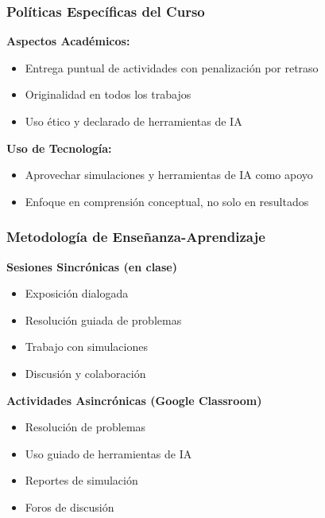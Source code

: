 \documentclass{beamer}
\begin{document}
\begin{frame}
	\frametitle{Políticas Específicas del Curso}
	
	\textbf{Aspectos Académicos:}
	
	\begin{itemize}
		\item Entrega puntual de actividades con penalización por retraso
		\item Originalidad en todos los trabajos
		\item Uso ético y declarado de herramientas de IA
	\end{itemize}

	\textbf{Uso de Tecnología:}
	
	\begin{itemize}
		\item Aprovechar simulaciones y herramientas de IA como apoyo
		\item Enfoque en comprensión conceptual, no solo en resultados
	\end{itemize}
	
\end{frame}

\begin{frame}
    \frametitle{Metodología de Enseñanza-Aprendizaje}
    
    \textbf{Sesiones Sincrónicas (en clase)}
    \begin{itemize}
        \item Exposición dialogada
        \item Resolución guiada de problemas
        \item Trabajo con simulaciones
        \item Discusión y colaboración
    \end{itemize}
    \vspace{0.3cm}
    
    \textbf{Actividades Asincrónicas (Google Classroom)}
    \begin{itemize}
        \item Resolución de problemas
        \item Uso guiado de herramientas de IA
        \item Reportes de simulación
        \item Foros de discusión
    \end{itemize}
\end{frame}
\end{document}
